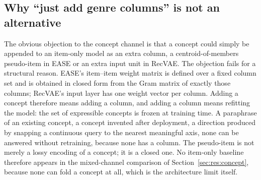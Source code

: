 \documentclass[manuscript,screen]{acmart}
\begin{document}
\subsection{Why ``just add genre columns'' is not an alternative}\label{sec:setup:columns}
The obvious objection to the concept channel is that a concept could simply be appended to an item-only model as an extra column, a centroid-of-members pseudo-item in EASE or an extra input unit in RecVAE. The objection fails for a structural reason. EASE's item--item weight matrix is defined over a fixed column set and is obtained in closed form from the Gram matrix of exactly those columns; RecVAE's input layer has one weight vector per column. Adding a concept therefore means adding a column, and adding a column means refitting the model: the set of expressible concepts is frozen at training time. A paraphrase of an existing concept, a concept invented after deployment, a direction produced by snapping a continuous query to the nearest meaningful axis, none can be answered without retraining, because none has a column. The pseudo-item is not merely a lossy encoding of a concept; it is a closed one. No item-only baseline therefore appears in the mixed-channel comparison of Section~\ref{sec:res:concept}, because none can fold a concept at all, which is the architecture limit itself.
\end{document}
